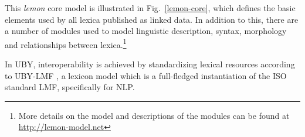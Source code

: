 This \emph{lemon} core model is illustrated in Fig.\ \ref{lemon-core}, which defines the
basic elements used by all lexica published as linked data. In addition to this, there
are a number of modules used to model linguistic description, syntax, morphology 
and relationships between lexica.\footnote{More details on the model and descriptions of
the modules can be found at \url{http://lemon-model.net}}


%

In UBY, interoperability is achieved by standardizing lexical resources according to UBY-LMF \cite{ecklekohler2012uby,TUD-CS-2013-0003}, a lexicon
model which is a full-fledged instantiation of the ISO standard LMF, specifically for NLP.

